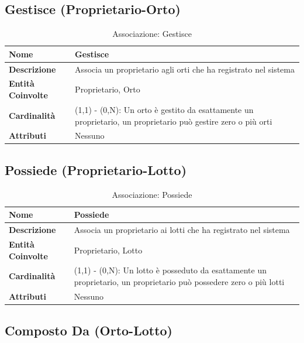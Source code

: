 \documentclass[12pt,a4paper]{article}
\begin{document}
\subsection{Gestisce (Proprietario-Orto)}

\begin{table}[H]
\centering
\caption{Associazione: Gestisce}
\begin{tabularx}{\textwidth}{|l|X|}
\hline
\textbf{Nome} & Gestisce \\
\hline
\textbf{Descrizione} & Associa un proprietario agli orti che ha registrato nel sistema \\
\hline
\textbf{Entità Coinvolte} & Proprietario, Orto \\
\hline
\textbf{Cardinalità} & (1,1) - (0,N): Un orto è gestito da esattamente un proprietario, un proprietario può gestire zero o più orti \\
\hline
\textbf{Attributi} & Nessuno \\
\hline
\end{tabularx}
\end{table}

\subsection{Possiede (Proprietario-Lotto)}

\begin{table}[H]
\centering
\caption{Associazione: Possiede}
\begin{tabularx}{\textwidth}{|l|X|}
\hline
\textbf{Nome} & Possiede \\
\hline
\textbf{Descrizione} & Associa un proprietario ai lotti che ha registrato nel sistema \\
\hline
\textbf{Entità Coinvolte} & Proprietario, Lotto \\
\hline
\textbf{Cardinalità} & (1,1) - (0,N): Un lotto è posseduto da esattamente un proprietario, un proprietario può possedere zero o più lotti \\
\hline
\textbf{Attributi} & Nessuno \\
\hline
\end{tabularx}
\end{table}

\subsection{Composto Da (Orto-Lotto)}
\end{document}
